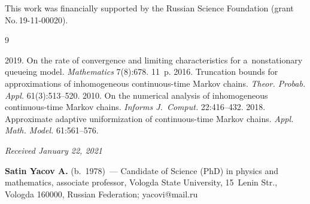 




\vspace*{-12pt}


\Ack

\vspace*{-5pt}
\noindent
This work was financially supported by the Russian Science Foundation (grant No.\,19-11-00020).


\renewcommand{\bibname}{\protect\rmfamily References}

{\small\frenchspacing
{%
\begin{thebibliography}{9}

\vspace*{-2pt}

2019. On the rate of convergence and limiting characteristics for a~nonstationary queueing model. 
\textit{Mathematics} 7(8):678. 11~p.
2016. Truncation bounds for approximations of inhomogeneous continuous-time Markov chains.
\textit{Theor. Probab. Appl.} 61(3):513--520.
2010. On the numerical analysis of inhomogeneous continuous-time Markov chains. 
\textit{Informs J.~Comput.} 22:416--432.
 2018. Approximate adaptive uniformization of continuous-time Markov chains. 
 \textit{Appl. Math. Model.} 61:561--576.
   \end{thebibliography}
} }

\vspace*{-6pt}

\hfill{\small\textit{Received January 22, 2021}} 

\vspace*{-12pt}

\Contrl

\vspace*{-3pt}

\noindent
\textbf{Satin Yacov A.} (b.\ 1978)~---  
Candidate of Science (PhD) in physics and mathematics, associate professor, 
Vologda State University, 15~Lenin Str., Vologda 160000, Russian Federation; \mbox{yacovi@mail.ru}



\label{end\stat}

\renewcommand{\bibname}{\protect\rm Литература}     
     
